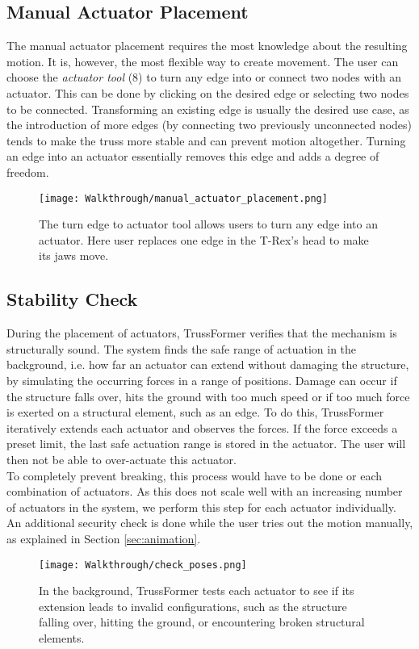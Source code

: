 \subsection{Manual Actuator Placement}
The manual actuator placement requires the most knowledge about the resulting motion. It is, however, the most flexible way to create movement. The user can choose the \textit{actuator tool} (8) to turn any edge into or connect two nodes with an actuator. This can be done by clicking on the desired edge or selecting two nodes to be connected. Transforming an existing edge is usually the desired use case, as the introduction of more edges (by connecting two previously unconnected nodes) tends to make the truss more stable and can prevent motion altogether. Turning an edge into an actuator essentially removes this edge and adds a degree of freedom.
\begin{figure}[h!]
    \texttt{[image: Walkthrough/manual\_actuator\_placement.png]}
    \centering
    \caption{The turn edge to actuator tool allows users to turn any edge into an actuator. Here user replaces one edge in the T-Rex’s head to make its jaws move.}
    \label{fig:manual_actuator}
\end{figure}

\subsection{Stability Check}
During the placement of actuators, TrussFormer verifies that the mechanism is structurally sound. The system finds the safe range of actuation in the background, i.e. how far an actuator can extend without damaging the structure, by simulating the occurring forces in a range of positions. Damage can occur if the structure falls over, hits the ground with too much speed or if too much force is exerted on a structural element, such as an edge. To do this, TrussFormer iteratively extends each actuator and observes the forces. If the force exceeds a preset limit, the last safe actuation range is stored in the actuator. The user will then not be able to over-actuate this actuator.\\
To completely prevent breaking, this process would have to be done or each combination of actuators. As this does not scale well with an increasing number of actuators in the system, we perform this step for each actuator individually. An additional security check is done while the user tries out the motion manually, as explained in Section \ref{sec:animation}.
\begin{figure}[h!]
    \texttt{[image: Walkthrough/check\_poses.png]}
    \centering
    \caption{In the background, TrussFormer tests each actuator to see if its extension leads to invalid configurations, such as the structure falling over, hitting the ground, or encountering broken structural elements.}
    \label{fig:check_poses}
\end{figure}

